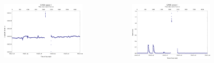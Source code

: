 \documentclass[xcolor=table]{beamer}
\begin{document}
\begin{frame}
\begin{columns}
      \begin{figure}
        \includegraphics[scale=0.40]{thesis/graphics/gnssLong1-1.png}
      \end{figure}
      \vspace{-30pt}
      \begin{figure}
        \includegraphics[scale=0.40]{thesis/graphics/gnssSpeed1-1.png}
      \end{figure}
    \end{columns}  
\end{frame}
\end{document}
